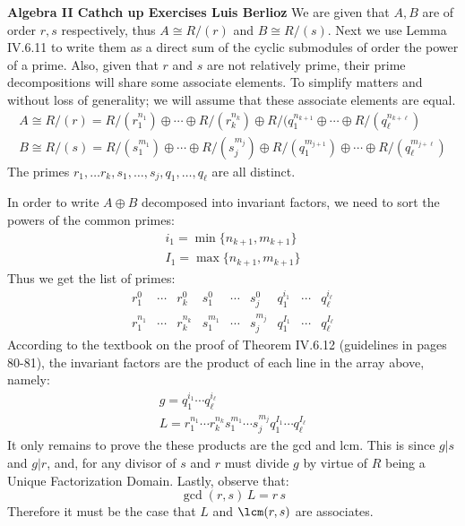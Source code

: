 \noindent\textbf{Algebra II Cathch up Exercises \hspace{\fill} Luis Berlioz}
 We are given that $A,B$ are of order $r,s$ respectively, thus  $A \cong R/(r)$ and $B\cong R/(s)$. 
 Next we use Lemma IV.6.11 to write them as a direct sum of the cyclic  submodules of order the power of a prime. 
 Also, given that $r$ and $s$ are not relatively prime, their prime decompositions will share some associate elements. 
 To simplify matters and without loss of generality; we will assume that these associate elements are equal.
\begin{gather*}
    A\cong R/(r) = R/(r_1^{n_1})\oplus \cdots \oplus R/(r_k^{n_k})\oplus R/(q_1^{n_{k+1}}\oplus \cdots \oplus R/(q_\ell^{n_{k+\ell}})\\
    B\cong R/(s) = R/(s_1^{m_1})\oplus \cdots \oplus R/(s_j^{m_{j}})\oplus R/(q_1^{m_{j+1}})\oplus \cdots \oplus R/(q_\ell^{m_{j+\ell}})
\end{gather*}
The primes $r_1,\ldots r_k,s_1,\ldots,s_j,q_1,\ldots,q_\ell$ are all distinct. 

In order to write $A\oplus B$ decomposed into invariant factors, we need to sort the powers of the common primes: 
\begin{gather*}
    i_1= \min\{ n_{k+1},m_{k+1}\}\\
    I_1= \max\{ n_{k+1},m_{k+1}\}
\end{gather*}
Thus we get the list of primes:
\begin{equation*}
 \begin{matrix}
     r_1^{0}   & \cdots & r_k^{0}   & s_1^{0}   & \cdots & s_j^{0} & q_1^{i_1} & \cdots    & q_\ell^{i_\ell} \\
     r_1^{n_1} & \cdots & r_k^{n_k} & s_1^{m_1} & \cdots & s_j^{m_{j}}  & q_1^{I_1} & \cdots & q_\ell^{I_\ell}
\end{matrix} 
\end{equation*}
According to the textbook on the proof of Theorem IV.6.12 (guidelines in pages 80-81), the invariant factors are the product of each line in the array above, namely:
\begin{gather*}
    g= q_1^{i_1}\cdots q_\ell^{i_\ell}\\
    L= r_1^{n_1}  \cdots  r_k^{n_k}  s_1^{m_1}  \cdots  s_j^{m_{j}}   q_1^{I_1}  \cdots  q_\ell^{I_\ell}
\end{gather*}
It only remains to prove the these products are the gcd and lcm. This is since $g| s$ and $g|r$, and, for any divisor of $s$ and $r$ must divide $g$ by virtue of $R$ being a Unique Factorization Domain. Lastly, observe that:
$$\gcd(r,s)\, L = r\,s$$
Therefore it must be the case that $L$ and $\lcm(r,s)$ are associates.

